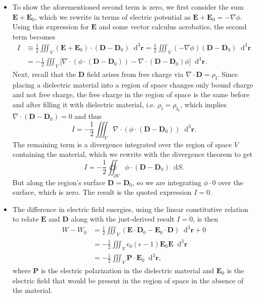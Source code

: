 \documentclass[11pt, a4paper]{article}
\newcommand{\diff}{\mathop{}\!\mathrm{d}} %
\newcommand{\dr}{\diff^{3} \r}  %
\renewcommand{\vec}[1]{\bm{#1}} %
\renewcommand{\r}{\vec{r}}
\newcommand{\E}{\vec{E}} %
\newcommand{\D}{\vec{D}}  %
\renewcommand{\P}{\vec{P}}  %
\newcommand{\ee}{\epsilon_{0}}  %
\renewcommand{\div}{\nabla \cdot}
\renewcommand{\grad}{\nabla}
\begin{document}
\begin{itemize}
    \item To show the aforementioned second term is zero, we first consider the sum $ \E + \E_{0} $, which we rewrite in terms of electric potential as $ \E + \E_{0} = - \grad \phi $. Using this expression for $ \E $ and some vector calculus acrobatics, the second term becomes
	\begin{align*}
        I & \equiv \frac{1}{2}\iiint_{V}(\E + \E_{0})\cdot (\D - \D_{0})\dr = \frac{1}{2}\iiint_{V} (- \grad \phi)(\D - \D_{0}) \dr \\
        & = -\frac{1}{2}\iiint_{V}\big[\div (\phi \cdot (\D - \D_{0})) - \div (\D - \D_{0})\phi \big]\dr.
	\end{align*}
    Next, recall that the $ \D $ field arises from free charge via $ \div \D = \rho_{\text{f}} $. Since placing a dielectric material into a region of space changes only bound charge and not free charge, the free charge in the region of space is the same before and after filling it with dielectric material, i.e. $ \rho_{\text{f}} = \rho_{\text{f}_{0}}$, which implies $ \div (\D - \D_{0}) = 0 $ and thus
    \begin{equation*}
        I = -\frac{1}{2}\iiint_{V}\div (\phi \cdot (\D - \D_{0}))\dr.
    \end{equation*}
	The remaining term is a divergence integrated over the region of space $ V $ containing the material, which we rewrite with the divergence theorem to get
	\begin{equation*}
        I = -\frac{1}{2}\oiint_{\partial V} \phi \cdot (\D - \D_{0})\diff S.
	\end{equation*}
    But along the region's surface $ \D = \D_{0} $, so we are integrating $ \phi \cdot 0 $ over the surface, which is zero. The result is the quoted expression $ I = 0 $.
	
    \item The difference in electric field energies, using the linear constitutive relation to relate $ \E $ and $ \D $ along with the just-derived result $ I = 0 $, is then
	\begin{align*}
		W - W_{0}  &= \frac{1}{2}\iiint_{V}(\E \cdot \D_{0} - \E_{0}\cdot\D)\dr + 0\\
		& = - \frac{1}{2}\iiint_{V} \ee(\epsilon - 1)\E_{0}\E \dr\\
		& = -\frac{1}{2}\iiint_{V}\P \cdot \E_{0}\dr,
	\end{align*}
	where $ \P $ is the electric polarization in the dielectric material and $ \E_{0} $ is the electric field that would be present in the region of space in the absence of the material.
	
	
	
\end{itemize}
\end{document}
